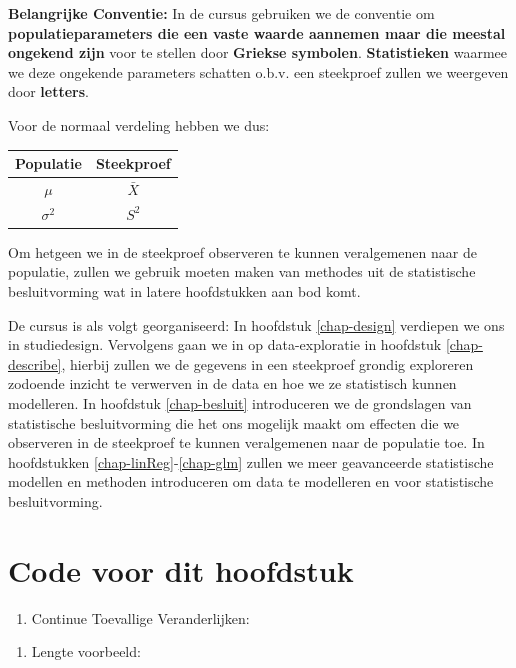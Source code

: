 \documentclass[
  12pt,dutch]{book}
\newcounter{none} %
\providecommand{\tightlist}{%
  \setlength{\itemsep}{0pt}\setlength{\parskip}{0pt}}
\theoremstyle{definition}
\theoremstyle{definition}
\theoremstyle{definition}
\theoremstyle{definition}
\theoremstyle{remark}
\begin{document}
\textbf{Belangrijke Conventie:} In de cursus gebruiken we de conventie om \textbf{populatieparameters die een vaste waarde aannemen maar die meestal ongekend zijn} voor te stellen door \textbf{Griekse symbolen}. \textbf{Statistieken} waarmee we deze ongekende parameters schatten o.b.v. een steekproef zullen we weergeven door \textbf{letters}.

Voor de normaal verdeling hebben we dus:

{\def\LTcaptype{none} %
\begin{longtable}[]{@{}cc@{}}
\toprule\noalign{}
Populatie & Steekproef \\
\midrule\noalign{}
\endhead
\bottomrule\noalign{}
\endlastfoot
\(\mu\) & \(\bar X\) \\
\(\sigma^2\) & \(S^2\) \\
\end{longtable}
}

Om hetgeen we in de steekproef observeren te kunnen veralgemenen naar de populatie, zullen we gebruik moeten maken van methodes uit de statistische besluitvorming wat in latere hoofdstukken aan bod komt.

De cursus is als volgt georganiseerd:
In hoofdstuk \ref{chap-design} verdiepen we ons in studiedesign. Vervolgens gaan we in op data-exploratie in hoofdstuk \ref{chap-describe}, hierbij zullen we de gegevens in een steekproef grondig exploreren zodoende inzicht te verwerven in de data en hoe we ze statistisch kunnen modelleren.
In hoofdstuk \ref{chap-besluit} introduceren we de grondslagen van statistische besluitvorming die het ons mogelijk maakt om effecten die we observeren in de steekproef te kunnen veralgemenen naar de populatie toe.
In hoofdstukken \ref{chap-linReg}-\ref{chap-glm} zullen we meer geavanceerde statistische modellen en methoden introduceren om data te modelleren en voor statistische besluitvorming.

\section{Code voor dit hoofdstuk}\label{code-voor-dit-hoofdstuk}

\begin{enumerate}
\def\labelenumi{\arabic{enumi}.}
\tightlist
\item
  Continue Toevallige Veranderlijken:
\end{enumerate}

\begin{enumerate}
\def\labelenumi{\arabic{enumi}.}
\setcounter{enumi}{1}
\tightlist
\item
  Lengte voorbeeld:
\end{enumerate}
\end{document}
